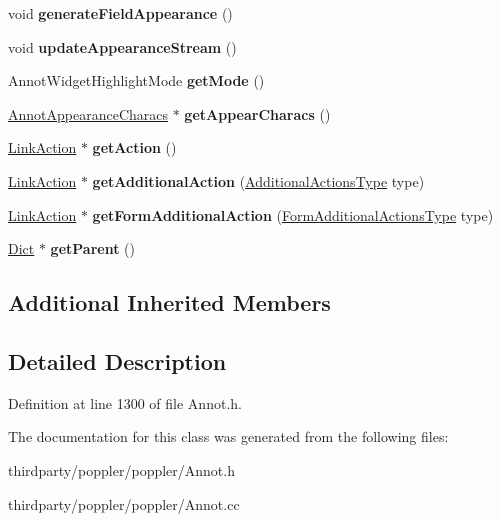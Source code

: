 \begin{DoxyCompactItemize}
void {\bfseries generate\+Field\+Appearance} ()
\item 
\mbox{\label{class_annot_widget_a42a1a897c01a41a9e01c88027c557f6c}} 
void {\bfseries update\+Appearance\+Stream} ()
\item 
\mbox{\label{class_annot_widget_aad459f30d6af557d7d375f3b917a7533}} 
Annot\+Widget\+Highlight\+Mode {\bfseries get\+Mode} ()
\item 
\mbox{\label{class_annot_widget_ac9f9ea5a5c6bfae222b64fe87a2620eb}} 
\hyperlink{class_annot_appearance_characs}{Annot\+Appearance\+Characs} $\ast$ {\bfseries get\+Appear\+Characs} ()
\item 
\mbox{\label{class_annot_widget_a45d857bd17fccfa614af502abf8d0cd5}} 
\hyperlink{class_link_action}{Link\+Action} $\ast$ {\bfseries get\+Action} ()
\item 
\mbox{\label{class_annot_widget_aa6e74871557caa8478ac443f86781130}} 
\hyperlink{class_link_action}{Link\+Action} $\ast$ {\bfseries get\+Additional\+Action} (\hyperlink{class_annot_aee99d73d7beb3a7aef74f6bc68cc797f}{Additional\+Actions\+Type} type)
\item 
\mbox{\label{class_annot_widget_a02dc9f70ba07984f3835583f042cd138}} 
\hyperlink{class_link_action}{Link\+Action} $\ast$ {\bfseries get\+Form\+Additional\+Action} (\hyperlink{class_annot_abf107d3384b67dc4314bc477195077e3}{Form\+Additional\+Actions\+Type} type)
\item 
\mbox{\label{class_annot_widget_a4d2ff8298307bb6192601903f21dac70}} 
\hyperlink{class_dict}{Dict} $\ast$ {\bfseries get\+Parent} ()
\end{DoxyCompactItemize}
\subsection*{Additional Inherited Members}


\subsection{Detailed Description}


Definition at line 1300 of file Annot.\+h.



The documentation for this class was generated from the following files\+:\begin{DoxyCompactItemize}
\item 
thirdparty/poppler/poppler/Annot.\+h\item 
thirdparty/poppler/poppler/Annot.\+cc\end{DoxyCompactItemize}
